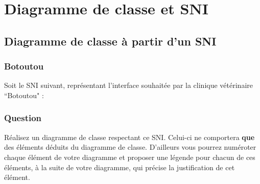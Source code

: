 \documentclass[12pt]{article}
\def\dc{\textsf{diagramme de classe}}
\def\sni{\textsf{SNI}}
\begin{document}
\begin{center}
\fbox{
  \begin{minipage}{6in}
    \hfill\vspace{4.5in}
  \end{minipage}
}
\end{center}

\section{Diagramme de classe et SNI}

\subsection{Diagramme de classe à partir d'un SNI}

\subsubsection*{Botoutou}

Soit le \sni{} suivant, représentant l'interface souhaitée par la clinique vétérinaire ``Botoutou" :

\begin{center}
\end{center}

\subsubsection*{Question}

Réalisez un \dc{} respectant ce \sni. Celui-ci ne comportera \textbf{que} des éléments déduits du \dc.
D'ailleurs vous pourrez numéroter chaque élément de votre diagramme et proposer une légende pour chacun
de ces éléments, à la suite de votre diagramme, qui précise la justification de cet élément.
\end{document}
